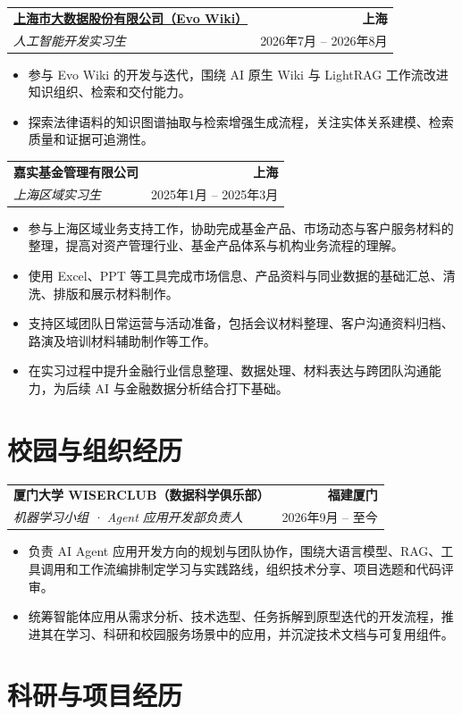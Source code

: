 \documentclass[letterpaper,11pt]{ctexart}
\makeatletter
\newcommand{\resumeProject}[4]{
    \vspace{3pt}
    \noindent
    \begin{tabular*}{\textwidth}{l@{\extracolsep{\fill}}r}
        \textbf{#1} & \textbf{#2} \\
        \textit{\textcolor{textgray}{#3}} & \textcolor{textgray}{#4} \\
    \end{tabular*}
    \vspace{-3pt}
}
\makeatother
\begin{document}
\resumeProject
{\href{https://github.com/easyhang/evo_wiki}{上海市大数据股份有限公司（Evo Wiki）}}
{上海}
{人工智能开发实习生}
{2026年7月 -- 2026年8月}
\begin{itemize}
  \item 参与 Evo Wiki 的开发与迭代，围绕 AI 原生 Wiki 与 LightRAG 工作流改进知识组织、检索和交付能力。
  \item 探索法律语料的知识图谱抽取与检索增强生成流程，关注实体关系建模、检索质量和证据可追溯性。
\end{itemize}

\resumeProject
{嘉实基金管理有限公司}
{上海}
{上海区域实习生}
{2025年1月 -- 2025年3月}
\begin{itemize}
  \item 参与上海区域业务支持工作，协助完成基金产品、市场动态与客户服务材料的整理，提高对资产管理行业、基金产品体系与机构业务流程的理解。
  \item 使用 Excel、PPT 等工具完成市场信息、产品资料与同业数据的基础汇总、清洗、排版和展示材料制作。
  \item 支持区域团队日常运营与活动准备，包括会议材料整理、客户沟通资料归档、路演及培训材料辅助制作等工作。
  \item 在实习过程中提升金融行业信息整理、数据处理、材料表达与跨团队沟通能力，为后续 AI 与金融数据分析结合打下基础。
\end{itemize}

\section{校园与组织经历}

\resumeProject
{厦门大学 WISERCLUB（数据科学俱乐部）}
{福建厦门}
{机器学习小组 · Agent 应用开发部负责人}
{2026年9月 -- 至今}
\begin{itemize}
  \item 负责 AI Agent 应用开发方向的规划与团队协作，围绕大语言模型、RAG、工具调用和工作流编排制定学习与实践路线，组织技术分享、项目选题和代码评审。
  \item 统筹智能体应用从需求分析、技术选型、任务拆解到原型迭代的开发流程，推进其在学习、科研和校园服务场景中的应用，并沉淀技术文档与可复用组件。
\end{itemize}

\section{科研与项目经历}
\end{document}
